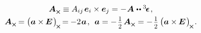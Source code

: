 \begin{otherlanguage}{russian}
\nopagebreak\vspace{-0.15em}\begin{equation}\label{pseudovectorinvariant}
\begin{array}{c}
\bm{A}_{\Xcompanion} \equiv A_{ij} \hspace{.25ex} \bm{e}_i \times \bm{e}_j = - \hspace{0.1ex} \bm{A} \hspace{0.1ex} \dotdotp \levicivitatensor 
\hspace{.2ex}, \\[.3em]
%
\bm{A}_{\Xcompanion} \hspace{-0.16ex} = \left(^{\mathstrut} \hspace{-0.1ex} \bm{a} \times\hspace{-0.1ex} \bm{E} \hspace{.2ex} \right)_{\hspace{-0.25ex}\Xcompanion} \hspace{-0.25ex} = \hspace{-0.12ex}
- 2 \hspace{0.16ex} \bm{a} \hspace{.2ex},\:\:
\bm{a} = - \hspace{.2ex} \smalldisplaystyleonehalf \hspace{.25ex} \bm{A}_{\Xcompanion} = - \hspace{.2ex} \smalldisplaystyleonehalf \left(^{\mathstrut} \hspace{-0.1ex} \bm{a} \times\hspace{-0.1ex} \bm{E} \hspace{.2ex} \right)_{\hspace{-0.25ex}\Xcompanion} \hspace{-0.2ex}.
\end{array}
\end{equation}


\end{otherlanguage}

